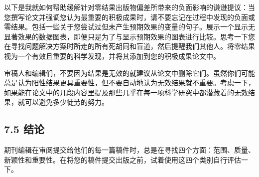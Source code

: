 以下是我就如何帮助缓解针对零结果出版物偏差所带来的负面影响的谦逊提议：当您撰写论文并强调您认为最重要的积极成果时，请不要忘记在过程中发现的负面或零结果。包括一些关于您尝试过但未产生预期效果的变量的句子。展示一个显示无显著效果的数据图表，即便只是为了与显示预期效果的图表进行比较。思考一下您在寻找问题解决方案时所走的所有死胡同和盲道，然后提醒我们其他人。将零结果视为一个有效且重要的科学发现，并将其添加到您的积极成果论文中。

审稿人和编辑们，不要因为结果是无效的就建议从论文中删除它们。虽然你们可能总是认为阳性结果更具重要性，但不要自动地认为无效结果就不重要。考虑一下，如果能在论文中的几段内容里提及那些几乎在每一项科学研究中都潜藏着的无效结果，就可以避免多少徒劳的努力。

\subsection*{7.5 结论}
期刊编辑在审阅提交给他们的每一篇稿件时，总是在寻找四个方面：范围、质量、新颖性和重要性。在将您的稿件提交出版之前，试着使用这四个类别自行评估一下。

